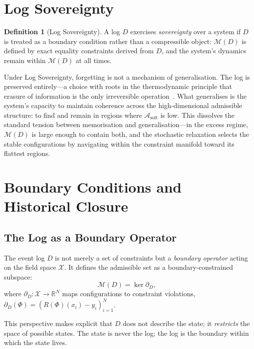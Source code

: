 \documentclass[12pt,oneside]{article}
\theoremstyle{plain}
\theoremstyle{definition}
\newtheorem{definition}[theorem]{Definition}
\theoremstyle{remark}
\newcommand{\X}{\mathcal{X}}
\newcommand{\M}{\mathcal{M}}
\newcommand{\D}{D}
\newcommand{\Asoft}{\mathcal{A}_{\mathrm{soft}}}
\begin{document}
\section{Log Sovereignty}
\label{sec:sovereignty}

\begin{definition}[Log Sovereignty]
A log $\D$ exercises \emph{sovereignty} over a system if $\D$ is treated as a
boundary condition rather than a compressible object: $\M(\D)$ is defined by
exact equality constraints derived from $\D$, and the system's dynamics remain
within $\M(\D)$ at all times.
\end{definition}

Under Log Sovereignty, forgetting is not a mechanism of generalisation. The log
is preserved entirely---a choice with roots in the thermodynamic principle that
erasure of information is the only irreversible operation~\cite{Landauer1961,Bennett1982}.
What generalises is the system's capacity to maintain coherence across the
high-dimensional admissible structure: to find and remain in regions where
$\Asoft$ is low. This dissolves the standard tension between memorisation and
generalisation---in the excess regime, $\M(\D)$ is large enough to contain both,
and the stochastic relaxation selects the stable configurations by navigating
within the constraint manifold toward its flattest regions.

\section{Boundary Conditions and Historical Closure}
\label{sec:boundary}

\subsection{The Log as a Boundary Operator}

The event log $\D$ is not merely a set of constraints but a \emph{boundary
operator} acting on the field space $\X$. It defines the admissible set as a
boundary-constrained subspace:
\[
  \M(\D) = \ker\partial_\D,
\]
where $\partial_\D : \X \to \mathbb{R}^N$ maps configurations to constraint
violations, $\partial_\D(\Phi) = (R(\Phi)(x_i) - y_i)_{i=1}^N$.

This perspective makes explicit that $\D$ does not describe the state; it
\emph{restricts} the space of possible states. The state is never the log; the
log is the boundary within which the state lives.
\end{document}
